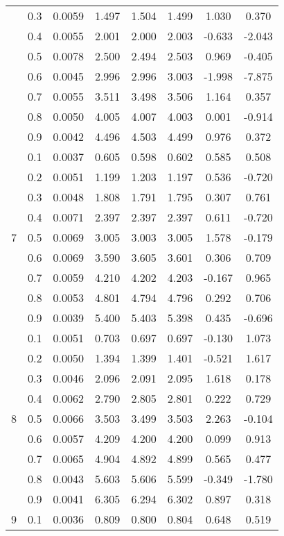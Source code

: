 \documentclass[11pt,a4paper]{report}
\begin{document}
\begin{longtable}{ | c | c || c | c | c | c | c | c | }
 & 0.3 & 0.0059 & 1.497 & 1.504 & 1.499 & 1.030 & 0.370 \\
 & 0.4 & 0.0055 & 2.001 & 2.000 & 2.003 & -0.633 & -2.043 \\
 & 0.5 & 0.0078 & 2.500 & 2.494 & 2.503 & 0.969 & -0.405 \\
 & 0.6 & 0.0045 & 2.996 & 2.996 & 3.003 & -1.998 & -7.875 \\
 & 0.7 & 0.0055 & 3.511 & 3.498 & 3.506 & 1.164 & 0.357 \\
 & 0.8 & 0.0050 & 4.005 & 4.007 & 4.003 & 0.001 & -0.914 \\
 & 0.9 & 0.0042 & 4.496 & 4.503 & 4.499 & 0.976 & 0.372 \\
 \hline
\multirow{9}{*}{7} & 0.1 & 0.0037 & 0.605 & 0.598 & 0.602 & 0.585 & 0.508 \\
 & 0.2 & 0.0051 & 1.199 & 1.203 & 1.197 & 0.536 & -0.720 \\
 & 0.3 & 0.0048 & 1.808 & 1.791 & 1.795 & 0.307 & 0.761 \\
 & 0.4 & 0.0071 & 2.397 & 2.397 & 2.397 & 0.611 & -0.720 \\
 & 0.5 & 0.0069 & 3.005 & 3.003 & 3.005 & 1.578 & -0.179 \\
 & 0.6 & 0.0069 & 3.590 & 3.605 & 3.601 & 0.306 & 0.709 \\
 & 0.7 & 0.0059 & 4.210 & 4.202 & 4.203 & -0.167 & 0.965 \\
 & 0.8 & 0.0053 & 4.801 & 4.794 & 4.796 & 0.292 & 0.706 \\
 & 0.9 & 0.0039 & 5.400 & 5.403 & 5.398 & 0.435 & -0.696 \\
 \hline
\multirow{9}{*}{8} & 0.1 & 0.0051 & 0.703 & 0.697 & 0.697 & -0.130 & 1.073 \\
 & 0.2 & 0.0050 & 1.394 & 1.399 & 1.401 & -0.521 & 1.617 \\
 & 0.3 & 0.0046 & 2.096 & 2.091 & 2.095 & 1.618 & 0.178 \\
 & 0.4 & 0.0062 & 2.790 & 2.805 & 2.801 & 0.222 & 0.729 \\
 & 0.5 & 0.0066 & 3.503 & 3.499 & 3.503 & 2.263 & -0.104 \\
 & 0.6 & 0.0057 & 4.209 & 4.200 & 4.200 & 0.099 & 0.913 \\
 & 0.7 & 0.0065 & 4.904 & 4.892 & 4.899 & 0.565 & 0.477 \\
 & 0.8 & 0.0043 & 5.603 & 5.606 & 5.599 & -0.349 & -1.780 \\
 & 0.9 & 0.0041 & 6.305 & 6.294 & 6.302 & 0.897 & 0.318 \\
 \hline
\multirow{9}{*}{9} & 0.1 & 0.0036 & 0.809 & 0.800 & 0.804 & 0.648 & 0.519 \\

\end{longtable}
\end{document}
